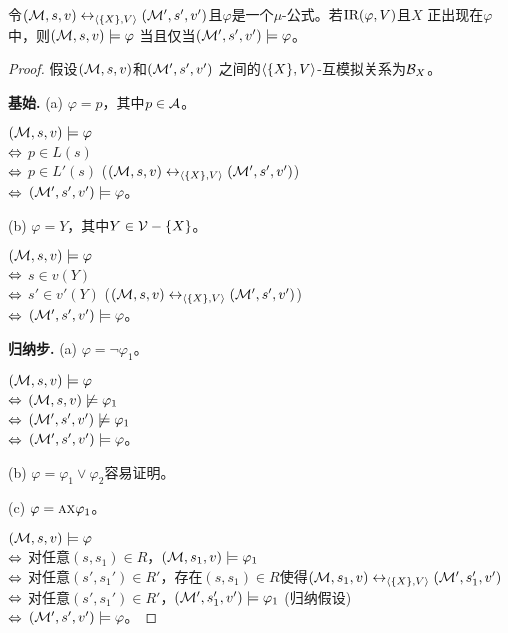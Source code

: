 \begin{lemma}
	\label{cor:VarInvariant}
	令$({\cal M},s,v) \leftrightarrow_{{\langle{\{X\},V}\rangle}} ({\cal M}',s',v')$且$\varphi$是一个$\mu$-公式。若$\textrm{IR}(\varphi,V)$且$X$ 正出现在$\varphi$中，则$({\cal M},s,v) \models \varphi$ 当且仅当$({\cal M}',s',v') \models \varphi$。
\end{lemma}
\begin{proof}
	假设$({\cal M},s,v)$和$({\cal M}',s',v')$ 之间的${{\langle{\{X\},V}\rangle}}$-互模拟关系为${\cal B}_X$。%
	
	\textbf{基始.} (a) $\varphi = p$，其中$p \in {\cal A}$。
	
	$({\cal M},s,v) \models \varphi$ \\
	$\Leftrightarrow$ $p \in L(s)$\\
	$\Leftrightarrow$ $p \in L'(s)$ \hfill ($({\cal M},s,v) \leftrightarrow_{{\langle{\{X\},V}\rangle}} ({\cal M}',s',v')$)\\
	$\Leftrightarrow$ $({\cal M}',s',v') \models \varphi$。
	
	(b) $\varphi = Y$，其中$Y \in {\cal V}-\{X\}$。
	
	$({\cal M},s,v) \models \varphi$ \\
	$\Leftrightarrow$ $s\in v(Y)$\\
	$\Leftrightarrow$ $s' \in v'(Y)$ \hfill ($({\cal M},s,v) \leftrightarrow_{{\langle{\{X\},V}\rangle}} ({\cal M}',s',v')$)\\
	$\Leftrightarrow$ $({\cal M}',s',v') \models \varphi$。
	
	
	
	
	
	
	\textbf{归纳步.} (a) $\varphi = \neg \varphi_1$。
	
	$({\cal M},s,v) \models \varphi$\\
	$\Leftrightarrow$ $({\cal M},s,v) \not \models \varphi_1$ \\
	$\Leftrightarrow$ $({\cal M}',s', v') \not \models \varphi_1$ \\
	$\Leftrightarrow$ $({\cal M}',s',v') \models \varphi$。
	
	
	(b) $\varphi = \varphi_1 \vee \varphi_2$容易证明。
	
	(c) $\varphi = \textsc{a} \textsc{x} \varphi_1$。
	
	$({\cal M},s,v) \models \varphi$ \\
	$\Leftrightarrow$ 对任意$(s, s_1) \in R$，$({\cal M},s_1,v) \models \varphi_1$\\
	$\Leftrightarrow$ 对任意$(s',s_1') \in R'$，存在$(s,s_1)\in R$使得$({\cal M}, s_1,v) \leftrightarrow_{{\langle{\{X\},V}\rangle}} ({\cal M}',s_1',v')$\\
	$\Leftrightarrow$ 对任意$(s',s_1') \in R'$，$({\cal M}',s_1',v') \models \varphi_1$ \hfill (归纳假设)\\
	$\Leftrightarrow$ $({\cal M}',s',v') \models \varphi$。
	

\end{proof}
